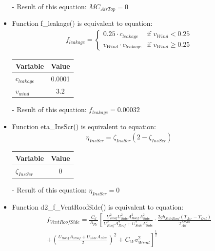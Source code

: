 \documentclass[a4paper]{article}
\numberwithin{equation}{section}
\begin{document}
\begin{itemize}
  \item[-] Result of this equation: \(MC_{AirTop} = 0\)

  \item Function f\_leakage() is equivalent to equation:
        \begin{align*}
          f_{leakage} = \begin{cases}
            0.25 \cdot c_{leakage}     & \text{if~} v_{Wind} < 0.25    \\
            v_{Wind} \cdot c_{leakage} & \text{if~} v_{Wind} \geq 0.25
          \end{cases}
        \end{align*}

        \begin{table}[H]
          \centering
          \begin{tabular}{@{}lS[table-format=1.4]@{}}
            \toprule
            \textbf{Variable} & \textbf{Value} \\
            \midrule
            \(c_{leakage}\)   & 0.0001         \\
            \(v_{wind}\)      & 3.2            \\
            \bottomrule
          \end{tabular}
        \end{table}

  \item[-] Result of this equation: \(f_{leakage} = 0.00032\)

  \item Function eta\_InsScr() is equivalent to equation:
        \begin{align*}
          \eta_{InsScr} = \zeta_{InsScr} (2 -  \zeta_{InsScr})
        \end{align*}

        \begin{table}[H]
          \centering
          \begin{tabular}{@{}lS@{}}
            \toprule
            \textbf{Variable}  & \textbf{Value} \\
            \midrule
            \(\zeta_{InsScr}\) & 0              \\
            \bottomrule
          \end{tabular}
        \end{table}

  \item[-] Result of this equation: \(\eta_{InsScr} = 0\)

  \item Function d2\_f\_VentRoofSide() is equivalent to equation:
        \begin{align*}
          f_{VentRoofSide} = \frac{C_d}{A_{Flr}} \left[\frac{U_{Roof}^2 U_{Side}^2 A_{Roof}^2 A_{Side}^2}{U_{Roof}^2 A_{Roof}^2 + U_{Side}^2 A_{Side}^2} \cdot \frac{2gh_{SideRoof} (T_{Air} - T_{Out})}{T_{Air}^{Mean}}\right. \\
          + \left.{ \left(\frac{U_{Roof} A_{Roof} + U_{Side} A_{Side}}{2}\right)}^2 + C_W v_{Wind}^2\right]^{\frac{1}{2}}
        \end{align*}


\end{itemize}
\end{document}
